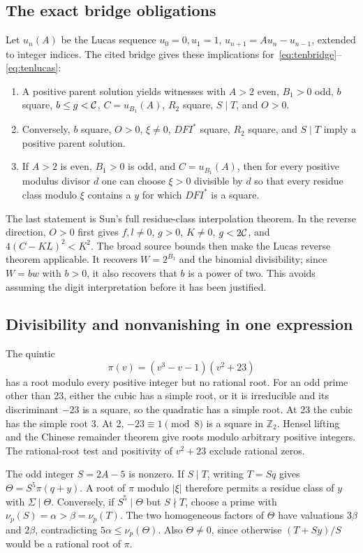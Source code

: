 \documentclass[11pt,letterpaper]{article}
\theoremstyle{definition}\newtheorem{definition}[theorem]{Definition}
\newcommand{\Z}{\mathbb Z}\newcommand{\N}{\mathbb N}\newcommand{\Pos}{\mathbb Z_{>0}}
\begin{document}
\subsection{The exact bridge obligations}
Let $u_n(A)$ be the Lucas sequence $u_0=0,u_1=1$,
$u_{n+1}=Au_n-u_{n-1}$, extended to integer indices. The cited bridge
gives these implications for~\eqref{eq:tenbridge}--\eqref{eq:tenlucas}:
\begin{enumerate}
\item A positive parent solution yields witnesses with $A>2$ even,
$B_1>0$ odd, $b$ square, $b\le g<\mathcal C$, $C=u_{B_1}(A)$,
$R_2$ square, $S\mid T$, and $O>0$.
\item Conversely, $b$ square, $O>0$, $\xi\ne0$, $DFI^*$ square,
$R_2$ square, and $S\mid T$ imply a positive parent solution.
\item If $A>2$ is even, $B_1>0$ is odd, and $C=u_{B_1}(A)$,
then for every positive modulus divisor $d$ one can choose $\xi>0$
divisible by $d$ so that every residue class modulo $\xi$ contains a
$y$ for which $DFI^*$ is a square.
\end{enumerate}
The last statement is Sun's full residue-class interpolation theorem.
In the reverse direction, $O>0$ first gives $f,l\ne0$, $g>0$,
$K\ne0$, $g<2\mathcal C$, and $4(C-KL)^2<K^2$. The broad source bounds
then make the Lucas reverse theorem applicable. It recovers
$W=2^{B_1}$ and the binomial divisibility; since $W=bw$ with $b>0$,
it also recovers that $b$ is a power of two. This avoids assuming the
digit interpretation before it has been justified.

\subsection{Divisibility and nonvanishing in one expression}
The quintic
\[
\pi(v)=(v^3-v-1)(v^2+23)
\]
has a root modulo every positive integer but no rational root. For an odd
prime other than 23, either the cubic has a simple root, or it is
irreducible and its discriminant $-23$ is a square, so the quadratic
has a simple root. At 23 the cubic has the simple root 3. At 2,
$-23\equiv1\pmod8$ is a square in $\Z_2$. Hensel lifting and the
Chinese remainder theorem give roots modulo arbitrary positive integers.
The rational-root test and positivity of $v^2+23$ exclude rational zeros.

The odd integer $S=2A-5$ is nonzero. If $S\mid T$, writing $T=Sq$ gives
$\Theta=S^5\pi(q+y)$. A root of $\pi$ modulo $|\xi|$ therefore permits
a residue class of $y$ with $\Sigma\mid\Theta$.
Conversely, if $S^5\mid\Theta$ but $S\nmid T$, choose a prime with
$\nu_p(S)=\alpha>\beta=\nu_p(T)$. The two homogeneous factors of
$\Theta$ have valuations $3\beta$ and $2\beta$, contradicting
$5\alpha\le\nu_p(\Theta)$. Also $\Theta\ne0$, since otherwise
$(T+Sy)/S$ would be a rational root of $\pi$.
\end{document}
